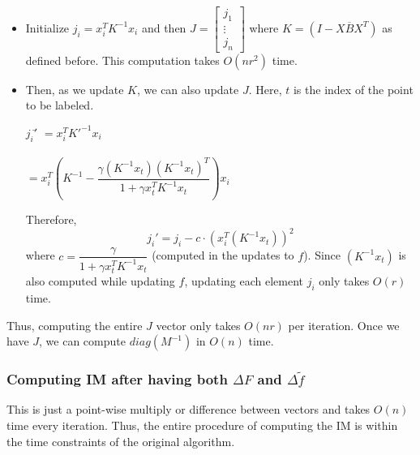 \documentclass[12pt]{article}
\newcommand{\inv}[1]{#1^{-1}}
\begin{document}
			\begin{itemize}
				\item Initialize $j_i= x_i^T \inv{K} x_i$ and then $J = \left[\begin{matrix}j_1\\ \vdots \\ j_n\end{matrix}\right]$ where $K=(I-X\overline{B}X^T)$ as defined before. This computation takes $O(nr^2)$ time.
				\item Then, as we update $K$, we can also update $J$. Here, $t$ is the index of the point to be labeled. 
				\begin{tabbing}
					$j_i'$\= $= x_i^T \inv{K'} x_i$\\\\
					\>$= x_i^T\left(\inv{K} - \dfrac{\gamma(\inv{K}x_t) (\inv{K}x_t)^T}{1+\gamma x_t^T \inv{K} x_t}\right)x_i$
				\end{tabbing}
				Therefore,
				\begin{equation}
					j_i' = j_i - c\cdot (x_i^T(\inv{K}x_t))^2	
				\end{equation}
				where $c = \dfrac{\gamma}{1+\gamma x_t^T \inv{K} x_t}$ (computed in the updates to $f$). Since $(\inv{K}x_t)$ is also computed while updating $f$, updating each element $j_i$ only takes $O(r)$ time. 

			\end{itemize}
			Thus, computing the entire $J$ vector only takes $O(nr)$ per iteration. Once we have $J$, we can compute $diag (\inv{M})$ in $O(n)$ time.



		\subsubsection{Computing IM after having both $\Delta F$ and $\Delta \widetilde{f}$}
			This is just a point-wise multiply or difference between vectors and takes $O(n)$ time every iteration. Thus, the entire procedure of computing the IM is within the time constraints of the original algorithm.
\end{document}
